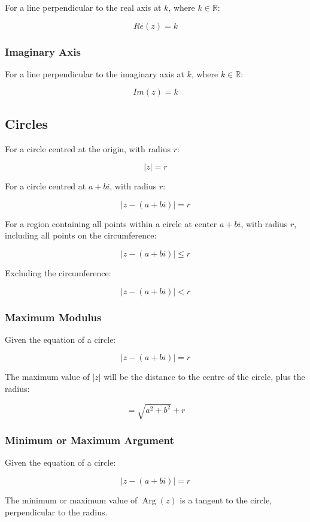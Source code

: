 \documentclass[a4paper,11pt]{article}
\DeclareMathOperator\Arg{Arg}
\begin{document}
For a line perpendicular to the real axis at $k$, where $k \in \mathbb{R}$:

$$
Re(z) = k
$$


\subsubsection{Imaginary Axis}

For a line perpendicular to the imaginary axis at $k$, where $k \in \mathbb{R}$:

$$
Im(z) = k
$$


\subsection{Circles}

For a circle centred at the origin, with radius $r$:

$$
\lvert z \rvert = r
$$

For a circle centred at $a + bi$, with radius $r$:

$$
\lvert z - (a + bi) \rvert = r
$$

For a region containing all points within a circle at center $a + bi$, with
radius $r$, including all points on the circumference:

$$
\lvert z - (a + bi) \rvert \leq r
$$

Excluding the circumference:

$$
\lvert z - (a + bi) \rvert < r
$$


\subsubsection{Maximum Modulus}

Given the equation of a circle:

$$
\lvert z - (a + bi) \rvert = r
$$

The maximum value of $\lvert z \rvert$ will be the distance to the centre of
the circle, plus the radius:

$$
= \sqrt{a^2 + b^2} + r
$$


\subsubsection{Minimum or Maximum Argument}

Given the equation of a circle:

$$
\lvert z - (a + bi) \rvert = r
$$

The minimum or maximum value of $\Arg(z)$ is a tangent to the circle,
perpendicular to the radius.
\end{document}
